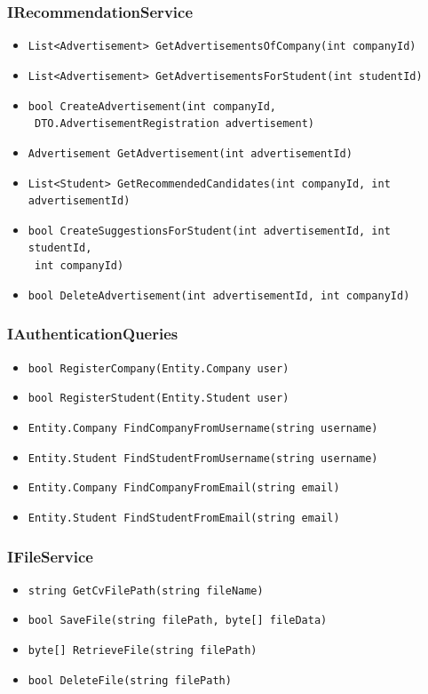 \subsubsection{IRecommendationService}
\begin{itemize}
    \item \verb|List<Advertisement> GetAdvertisementsOfCompany(int companyId)|
    \item \verb|List<Advertisement> GetAdvertisementsForStudent(int studentId)|
    \item \verb|bool CreateAdvertisement(int companyId,| \\ \makebox[10em][l]{} \verb| DTO.AdvertisementRegistration advertisement)|
    \item \verb|Advertisement GetAdvertisement(int advertisementId)|
    \item \verb|List<Student> GetRecommendedCandidates(int companyId, int advertisementId)|
    \item \verb|bool CreateSuggestionsForStudent(int advertisementId, int studentId,| \\ \makebox[10em][l]{} \verb| int companyId)|
    \item \verb|bool DeleteAdvertisement(int advertisementId, int companyId)|
\end{itemize}

\subsubsection{IAuthenticationQueries}
\begin{itemize}
    \item \verb|bool RegisterCompany(Entity.Company user)|
    \item \verb|bool RegisterStudent(Entity.Student user)|
    \item \verb|Entity.Company FindCompanyFromUsername(string username)|
    \item \verb|Entity.Student FindStudentFromUsername(string username)|
    \item \verb|Entity.Company FindCompanyFromEmail(string email)|
    \item \verb|Entity.Student FindStudentFromEmail(string email)|
\end{itemize}

\subsubsection{IFileService}
\begin{itemize}
    \item \verb|string GetCvFilePath(string fileName)|
    \item \verb|bool SaveFile(string filePath, byte[] fileData)|
    \item \verb|byte[] RetrieveFile(string filePath)|
    \item \verb|bool DeleteFile(string filePath)|
\end{itemize}

